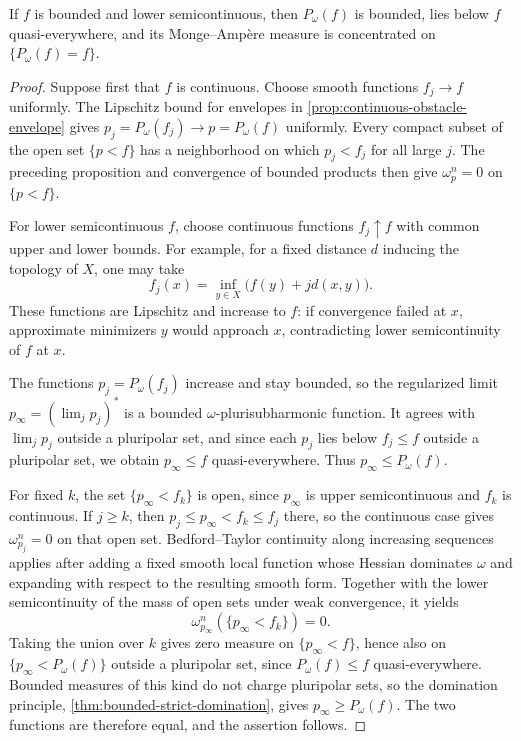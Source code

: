 \begin{proposition}
\label{prop:lsc-obstacle-support}
If $f$ is bounded and lower semicontinuous, then $P_\omega(f)$ is bounded, lies below $f$ quasi-everywhere, and its Monge--Amp\`ere measure is concentrated on $\{P_\omega(f)=f\}$.
\end{proposition}
\begin{proof}
Suppose first that $f$ is continuous. Choose smooth functions $f_j\to f$ uniformly. The Lipschitz bound for envelopes in \cref{prop:continuous-obstacle-envelope} gives $p_j=P_\omega(f_j)\to p=P_\omega(f)$ uniformly. Every compact subset of the open set $\{p<f\}$ has a neighborhood on which $p_j<f_j$ for all large $j$. The preceding proposition and convergence of bounded products then give $\omega_p^n=0$ on $\{p<f\}$.

For lower semicontinuous $f$, choose continuous functions $f_j\uparrow f$ with common upper and lower bounds. For example, for a fixed distance $d$ inducing the topology of $X$, one may take
\[
 f_j(x)=\inf_{y\in X}\bigl(f(y)+j d(x,y)\bigr).
\]
These functions are Lipschitz and increase to $f$: if convergence failed at $x$, approximate minimizers $y$ would approach $x$, contradicting lower semicontinuity of $f$ at $x$.

The functions $p_j=P_\omega(f_j)$ increase and stay bounded, so the regularized limit $p_\infty=(\lim_jp_j)^*$ is a bounded $\omega$-plurisubharmonic function. It agrees with $\lim_jp_j$ outside a pluripolar set, and since each $p_j$ lies below $f_j\leq f$ outside a pluripolar set, we obtain $p_\infty\leq f$ quasi-everywhere. Thus $p_\infty\leq P_\omega(f)$.

For fixed $k$, the set $\{p_\infty<f_k\}$ is open, since $p_\infty$ is upper semicontinuous and $f_k$ is continuous. If $j\geq k$, then $p_j\leq p_\infty<f_k\leq f_j$ there, so the continuous case gives $\omega_{p_j}^n=0$ on that open set. Bedford--Taylor continuity along increasing sequences applies after adding a fixed smooth local function whose Hessian dominates $\omega$ and expanding with respect to the resulting smooth form. Together with the lower semicontinuity of the mass of open sets under weak convergence, it yields
\[
 \omega_{p_\infty}^n(\{p_\infty<f_k\})=0.
\]
Taking the union over $k$ gives zero measure on $\{p_\infty<f\}$, hence also on $\{p_\infty<P_\omega(f)\}$ outside a pluripolar set, since $P_\omega(f)\leq f$ quasi-everywhere. Bounded measures of this kind do not charge pluripolar sets, so the domination principle, \cref{thm:bounded-strict-domination}, gives $p_\infty\geq P_\omega(f)$. The two functions are therefore equal, and the assertion follows.
\end{proof}

